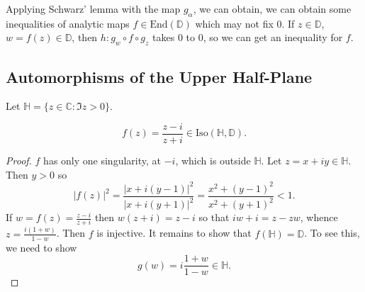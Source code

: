 \begin{remark}
Applying Schwarz' lemma with the map $g_\alpha$, we
can obtain, we can obtain some inequalities of
analytic maps $f \in \mathrm{End}(\mathbb{D})$ which
may not fix $0$.
If $z \in \mathbb{D}$, $w = f(z) \in \mathbb{D}$, then
$h : g_w \circ f \circ g_z$ takes 0 to 0, so
we can get an inequality for $f$.
\end{remark}

\subsection{Automorphisms of the Upper Half-Plane}
Let $\mathbb{H} = \{ z \in \mathbb{C} : \Im z > 0 \}$.
\begin{theorem}
$$
  f(z)
= \frac{z - i}{z + i}
\in \mathrm{Iso}(\mathbb{H}, \mathbb{D}).
$$
\end{theorem}
\begin{proof}
$f$ has only one singularity, at $-i$, which is outside $\mathbb{H}$.
Let $z = x + iy \in \mathbb{H}$. Then $y > 0$ so
$$
  |f(z)|^2
= \frac{|x + i(y - 1)|^2}
       {|x + i(y + 1)|^2}
= \frac{x^2 + (y - 1)^2}
       {x^2 + (y + 1)^2}
< 1.
$$
If $w = f(z) = \frac{z - i}{z + i}$ then
$w (z + i) = z - i$ so that
$i w + i = z - z w$, whence
$z = \frac{i (1 + w)}{1 - w}$. Then $f$ is injective.
It remains to show that $f(\mathbb{H}) = \mathbb{D}$. To see this,
we need to show
$$
g(w) = i \frac{1 + w}{1 - w} \in \mathbb{H}.
$$
\end{proof}
